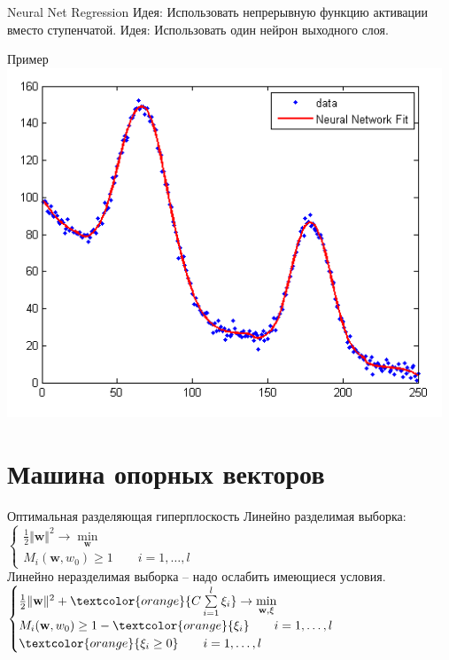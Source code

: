 \documentclass[10pt]{beamer}
\begin{document}
\begin{frame}{Neural Net Regression}
  \alert{Идея}: Использовать непрерывную функцию активации вместо ступенчатой.
  \bigbreak
  \pause
  \alert{Идея}: Использовать один нейрон выходного слоя.
\end{frame}

\begin{frame}{Пример}
  \centering
  \includegraphics[width=0.9 \textwidth, keepaspectratio]{images/nn}
\end{frame}

\section{Машина опорных векторов}

\begin{frame}{Оптимальная разделяющая гиперплоскость}
	Линейно разделимая выборка:\\
	$\begin{cases}
		{\frac{1}{2} \Vert \mathbf{w} \Vert^2 \rightarrow \min\limits_{\mathbf{w}}}\\
		M_i(\mathbf{w}, w_0) \geq 1   \qquad i = 1, \dots, l
	\end{cases}$\\
	\pause
	\bigbreak
	Линейно неразделимая выборка -- надо ослабить имеющиеся условия.\\
	$\begin{cases}
		{\frac{1}{2}\Vert \mathbf{w} \Vert^2 + \textcolor{orange}{C \sum\limits_{i=1}^l \xi_i} \rightarrow \min\limits_{\mathbf{w}, \xi}}\\
		M_i(\mathbf{w}, w_0) \geq 1 - \textcolor{orange}{\xi_i} \qquad i = 1, \dots, l\\
		\textcolor{orange}{\xi_i \geq 0} \qquad i = 1, \dots, l
	\end{cases}$\\
\end{frame}
\end{document}
